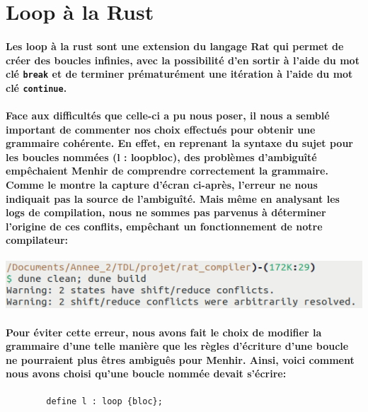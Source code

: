 \documentclass[french]{article}
\begin{document}
\section{Loop à la Rust}

\paragraph*{Les loop à la rust sont une extension du langage Rat qui permet de créer des boucles infinies,
avec la possibilité d'en sortir à l'aide du mot clé \texttt{break} 
et de terminer prématurément une itération à l'aide du mot clé \texttt{continue}.}
\paragraph{Face aux difficultés que celle-ci a pu nous poser, il nous a semblé important de commenter nos choix effectués pour obtenir une grammaire cohérente.
En effet, en reprenant la syntaxe du sujet pour les boucles nommées (l : loop{bloc}), des problèmes d'ambiguîté empêchaient Menhir de comprendre correctement la grammaire.
Comme le montre la capture d'écran ci-après, l'erreur ne nous indiquait pas la source de l'ambiguîté. Mais même en analysant les logs de compilation, nous ne sommes
pas parvenus à déterminer l'origine de ces conflits, empêchant un fonctionnement de notre compilateur:\\}
\begin{center}
        \includegraphics[scale=0.5]{shift_reduce.png}
\end{center}
\paragraph{Pour éviter cette erreur, nous avons fait le choix de modifier la grammaire d'une telle manière que les règles d'écriture d'une boucle ne pourraient
plus êtres ambiguês pour Menhir. Ainsi, voici comment nous avons choisi qu'une boucle nommée devait s'écrire: } %
\begin{lstlisting}
        define l : loop {bloc};
\end{lstlisting}
\end{document}
